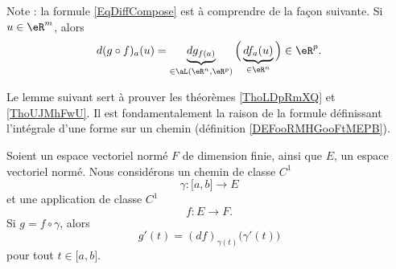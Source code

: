 \begin{remark}
	Note : la formule \eqref{EqDiffCompose} est à comprendre de la façon suivante. Si \( u\in\eR^m\), alors
	\begin{equation}
		d(g\circ f)_a(u)=\underbrace{dg_{f(a)}}_{\in\aL(\eR^n,\eR^p)}\Big( \underbrace{df_a(u)}_{\in\eR^n} \Big)\in\eR^p.
	\end{equation}
\end{remark}

Le lemme suivant sert à prouver les théorèmes \ref{ThoLDpRmXQ} et \ref{ThoUJMhFwU}. Il est fondamentalement la raison de la formule définissant l'intégrale d'une forme sur un chemin (définition \ref{DEFooRMHGooFtMEPB}).
\begin{lemma}        \label{LEMooKNBVooQSowos}
	Soient un espace vectoriel normé \( F\) de dimension finie, ainsi que \( E\), un espace vectoriel normé. Nous considérons un chemin de classe \( C^1\)
	\begin{equation}
		\gamma\colon \mathopen[ a , b \mathclose]\to E
	\end{equation}
	et une application de classe \( C^1\)
	\begin{equation}
		f\colon E\to F.
	\end{equation}
	Si \( g=f\circ\gamma\), alors
	\begin{equation}
		g'(t)=(df)_{\gamma(t)}\big( \gamma'(t) \big)
	\end{equation}
	pour tout \( t\in \mathopen[ a , b \mathclose]\).
\end{lemma}

